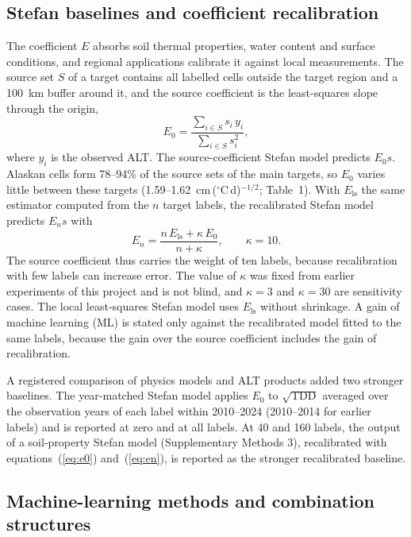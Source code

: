 \subsection{Stefan baselines and coefficient recalibration}\label{sec:m-stefan}

The coefficient $E$ absorbs soil thermal properties, water content and surface conditions, and regional applications calibrate it against local measurements\cite{Nelson1997}. The source set $S$ of a target contains all labelled cells outside the target region and a 100~km buffer around it, and the source coefficient is the least-squares slope through the origin,
\begin{equation}
E_0 = \frac{\sum_{i \in S} s_i\, y_i}{\sum_{i \in S} s_i^2},
\label{eq:e0}
\end{equation}
where $y_i$ is the observed ALT. The source-coefficient Stefan model predicts $E_0 s$. Alaskan cells form 78--94\% of the source sets of the main targets, so $E_0$ varies little between these targets (1.59--1.62~cm\,($^{\circ}$C\,d)$^{-1/2}$; Table~1). With $E_{\mathrm{ls}}$ the same estimator computed from the $n$ target labels, the recalibrated Stefan model predicts $E_n s$ with
\begin{equation}
E_n = \frac{n\, E_{\mathrm{ls}} + \kappa\, E_0}{n + \kappa}, \qquad \kappa = 10.
\label{eq:en}
\end{equation}
The source coefficient thus carries the weight of ten labels, because recalibration with few labels can increase error\cite{Steyerberg2004}. The value of $\kappa$ was fixed from earlier experiments of this project and is not blind, and $\kappa = 3$ and $\kappa = 30$ are sensitivity cases. The local least-squares Stefan model uses $E_{\mathrm{ls}}$ without shrinkage. A gain of machine learning (ML) is stated only against the recalibrated model fitted to the same labels, because the gain over the source coefficient includes the gain of recalibration.

A registered comparison of physics models and ALT products added two stronger baselines. The year-matched Stefan model applies $E_0$ to $\sqrt{\mathrm{TDD}}$ averaged over the observation years of each label within 2010--2024 (2010--2014 for earlier labels) and is reported at zero and at all labels. At 40 and 160 labels, the output of a soil-property Stefan model (Supplementary Methods 3), recalibrated with equations~(\ref{eq:e0}) and~(\ref{eq:en}), is reported as the stronger recalibrated baseline.

\subsection{Machine-learning methods and combination structures}\label{sec:m-ml}

